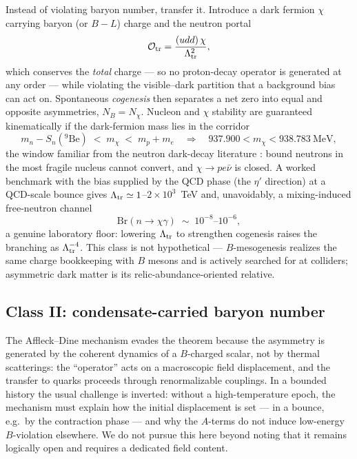 \documentclass[12pt,a4paper]{article}
\begin{document}
Instead of violating baryon number, transfer it.  Introduce a dark
fermion $\chi$ carrying baryon (or $B\!-\!L$) charge and the neutron
portal
\begin{equation}
\mathcal{O}_{\rm tr}=\frac{(udd)\,\chi}{\Lambda_{\rm tr}^{2}},
\end{equation}
which conserves the \emph{total} charge --- so no proton-decay operator
is generated at any order --- while violating the visible--dark
partition that a background bias can act on.  Spontaneous
\emph{cogenesis} then separates a net zero into equal and opposite
asymmetries, $N_{B}=N_{\chi}$.  Nucleon and $\chi$ stability are
guaranteed kinematically if the dark-fermion mass lies in the corridor
\begin{equation}
m_{n}-S_{n}(^{9}\mathrm{Be})\;<\;m_{\chi}\;<\;m_{p}+m_{e}
\quad\Longrightarrow\quad
937.900<m_{\chi}<938.783~\text{MeV},
\label{eq:corridor}
\end{equation}
the window familiar from the neutron dark-decay literature
\cite{FornalGrinstein}: bound neutrons in the most fragile nucleus
cannot convert, and $\chi\to pe\bar\nu$ is closed.  A worked benchmark
with the bias supplied by the QCD phase (the $\eta'$ direction) at a
QCD-scale bounce gives $\Lambda_{\rm tr}\simeq1$--$2\times10^{3}$~TeV
and, unavoidably, a mixing-induced free-neutron channel
\begin{equation}
\mathrm{Br}(n\to\chi\gamma)\;\sim\;10^{-8}\text{--}10^{-6},
\end{equation}
a genuine laboratory floor: lowering $\Lambda_{\rm tr}$ to strengthen
cogenesis raises the branching as $\Lambda_{\rm tr}^{-4}$.  This class
is not hypothetical --- $B$-mesogenesis \cite{Mesogenesis,
MesogenesisCollider} realizes the same charge bookkeeping with $B$
mesons and is actively searched for at colliders; asymmetric dark
matter \cite{KLZ} is its relic-abundance-oriented relative.

\subsection{Class II: condensate-carried baryon number}

The Affleck--Dine mechanism \cite{AffleckDine} evades the theorem
because the asymmetry is generated by the coherent dynamics of a
$B$-charged scalar, not by thermal scatterings: the ``operator'' acts on
a macroscopic field displacement, and the transfer to quarks proceeds
through renormalizable couplings.  In a bounded history the usual
challenge is inverted: without a high-temperature epoch, the mechanism
must explain how the initial displacement is set --- in a bounce, e.g.\
by the contraction phase --- and why the $A$-terms do not induce
low-energy $B$-violation elsewhere.  We do not pursue this here beyond
noting that it remains logically open and requires a dedicated field
content.
\end{document}
